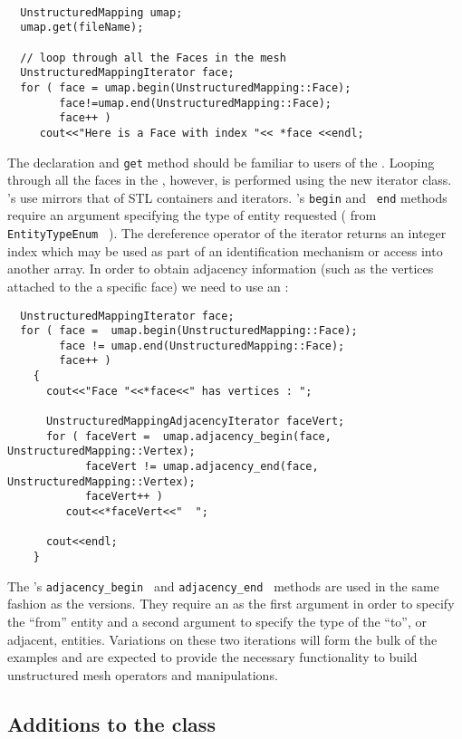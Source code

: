 \begin{verbatim}

  UnstructuredMapping umap;
  umap.get(fileName);

  // loop through all the Faces in the mesh
  UnstructuredMappingIterator face;
  for ( face = umap.begin(UnstructuredMapping::Face);
        face!=umap.end(UnstructuredMapping::Face);
        face++ )
     cout<<"Here is a Face with index "<< *face <<endl;
\end{verbatim}

The declaration and {\tt get} method should be familiar to users of
the \umap.  Looping through all the faces in the \umap, however, is
performed using the new \umapI iterator class.  \umapI's use mirrors
that of STL containers and iterators.  \umap's {\tt begin} and {\tt
end} methods require an argument specifying the type of entity
requested ( from {\tt EntityTypeEnum } ).  The dereference operator of
the iterator returns an integer index which may be used as part of an
identification mechanism or access into another array.  In order to
obtain adjacency information (such as the vertices attached to the a
specific face) we need to use an \umapAI :

\begin{verbatim}
  UnstructuredMappingIterator face;
  for ( face =  umap.begin(UnstructuredMapping::Face);
        face != umap.end(UnstructuredMapping::Face);
        face++ )
    {
      cout<<"Face "<<*face<<" has vertices : ";

      UnstructuredMappingAdjacencyIterator faceVert;
      for ( faceVert =  umap.adjacency_begin(face, UnstructuredMapping::Vertex);
            faceVert != umap.adjacency_end(face, UnstructuredMapping::Vertex);
            faceVert++ )
         cout<<*faceVert<<"  ";
      
      cout<<endl;
    }
\end{verbatim}

The \umap's {\tt adjacency\_begin } and {\tt adjacency\_end } methods
are used in the same fashion as the \umapI versions. They
require an \linebreak[4] \umapI as the first argument in order to specify the
``from'' entity and a second argument to specify the type of the
``to'', or adjacent, entities.  Variations on these two iterations
will form the bulk of the examples and are expected to provide the
necessary functionality to build unstructured mesh operators and
manipulations.

\subsection{Additions to the \umap class}
